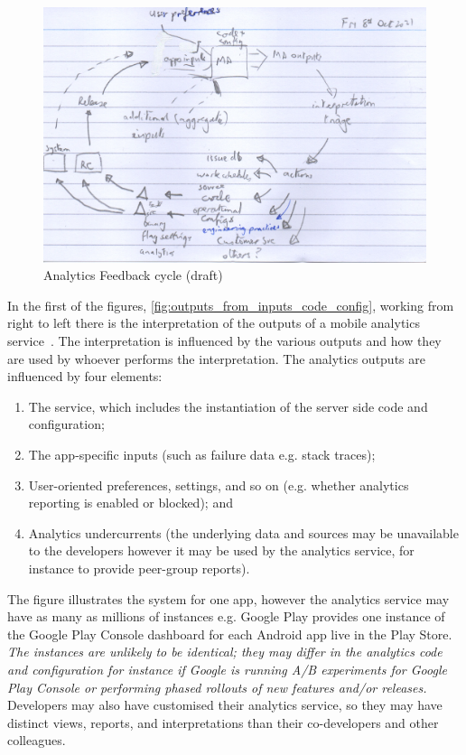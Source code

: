 \begin{figure}
    \includegraphics[width=\linewidth]{images/rough-sketches/analytics-feedback-cycle-11-oct-2021.jpeg}
    \caption{Analytics Feedback cycle (draft)}
    \label{fig:analytics-feedback-cycle}
\end{figure}

In the first of the figures, \ref{fig:outputs_from_inputs_code_config}, working from right to left there is the interpretation of the outputs of a mobile analytics service~. The interpretation is influenced by the various outputs and how they are used by whoever performs the interpretation. The analytics outputs are influenced by four elements: 
\begin{enumerate}
    \itemsep0em
    \item The service, which includes the instantiation of the server side code and configuration; 
    \item The app-specific inputs (such as failure data e.g. stack traces); 
    \item User-oriented preferences, settings, and so on (e.g. whether analytics reporting is enabled or blocked); and 
    \item Analytics undercurrents (the underlying data and sources may be unavailable to the developers however it may be used by the analytics service, for instance to provide peer-group reports).
\end{enumerate}

The figure illustrates the system for one app, however the analytics service may have as many as millions of instances e.g. Google Play provides one instance of the Google Play Console dashboard for each Android app live in the Play Store. \emph{The instances are unlikely to be identical; they may differ in the analytics code and configuration for instance if Google is running A/B experiments for Google Play Console or performing phased rollouts of new features and/or releases.} Developers may also have customised their analytics service, so they may have distinct views, reports, and interpretations than their co-developers and other colleagues.

